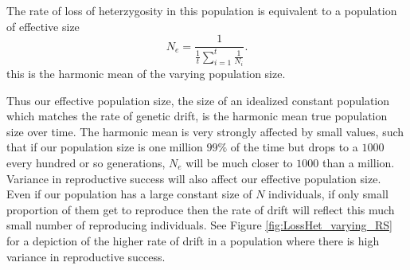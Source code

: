 The rate of loss of heterzygosity in this population is equivalent to
a population of effective size
\begin{equation}
N_e =\frac{1}{\frac{1}{t} \sum_{i=1}^{t} \frac{1}{N_i} }. \label{eq:Ne_harmonic}
\end{equation}
this is the harmonic mean of the varying population size.


Thus our
effective population size, the size of an idealized constant
population which matches the rate of genetic drift, is the harmonic
mean true population size over time. The harmonic mean is very
strongly affected by small values, such that if our population size is
one million $99\%$ of the time but drops to a $1000$ every hundred or
so generations, $N_e$ will be much closer to $1000$ than a
million. \\





Variance in reproductive success will also affect our effective
population size. Even if our population has a large constant size of $N$
individuals, if only small proportion of them get to reproduce then
the rate of drift will reflect this much small number of reproducing
individuals. See Figure \ref{fig:LossHet_varying_RS} for a depiction of the higher rate of drift
in a population where there is high variance in reproductive success.


